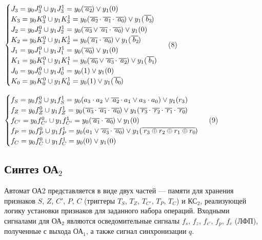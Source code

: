 $
\begin{cases}
J_3 = y_0 J^0_3 \cup y_1 J^1_3 = y_0 (\oline{a_2}) \vee y_1(0)
\\
K_3 = y_0 K^0_3 \cup y_1 K^1_3 = y_0 (\oline{a_2} \cdot \oline{a_1} \cdot \oline{a_0}) \vee y_1(\oline{b_3})
\\
J_2 = y_0 J^0_2 \cup y_1 J^1_2 = y_0 (\oline{a_3} \vee \oline{a_1} \cdot \oline{a_0}) \vee y_1(0)
\\
K_2 = y_0 K^0_2 \cup y_1 K^1_2 = y_0 (\oline{a_1} \cdot \oline{a_0}) \vee y_1(\oline{b_2})
\\
J_1 = y_0 J^0_1 \cup y_1 J^1_1 = y_0 (\oline{a_0}) \vee y_1(0)
\\
K_1 = y_0 K^0_1 \cup y_1 K^1_1 = y_0 (\oline{a_0} \vee \oline{a_3} \cdot \oline{a_2}) \vee y_1(\oline{b_1})
\\
J_0 = y_0 J^0_0 \cup y_1 J^1_0 = y_0 (1) \vee y_1(0)
\\
K_0 = y_0 K^0_0 \cup y_1 K^1_0 = y_0 (1) \vee y_1(\oline{b_0})
\end{cases}
$ (8)

$
\begin{cases}
f_S = y_0 f^0_S \cup y_1 f^1_S = y_0 (a_3 \cdot a_2 \vee \oline{a_2} \cdot a_1 \vee a_3 \cdot a_0) \vee y_1 (r_3)
\\
f_Z = y_0 f^0_Z \cup y_1 f^1_Z = y_0 (\oline{a_3} \cdot \oline{a_1} \cdot \oline{a_0}) \vee y_1 (\oline{r_3} \cdot \oline{r_2} \cdot \oline{r_1} \cdot \oline{r_0})
\\
f_{C'} = y_0 f^0_{C'} \cup y_1 f^1_{C'} = y_0 (\oline{a_1} \cdot \oline{a_0}) \vee y_1 (0)
\\
f_P = y_0 f^0_P \cup y_1 f^1_P = y_0 (a_1 \vee \oline{a_3} \cdot \oline{a_0}) \vee y_1 (\oline{r_3 \oplus r_2 \oplus r_1 \oplus r_0})
\\
f_C = y_0 f^0_C \cup y_1 f^1_C = y_0 (0) \vee y_1 (0)
\end{cases}
$ (9)



\clearpage
\subsection{Синтез ОА${}_2$}

 Автомат ОА2 представляется в виде двух частей --- памяти для хранения признаков $S$, $Z$, $C'$, $P$, $C$ (триггеры $T_S$, $T_Z$, $T_{C'}$, $T_P$, $T_C$) и КС$_2$, реализующей логику установки признаков для заданного набора операций. Входными сигналами для ОА$_2$ являются осведомительные сигналы $f_s$, $f_z$, $f_{c'}$, $f_p$, $f_c$ (ЛФП), полученные с выхода ОА$_{1}$, а также сигнал синхронизации $q$.

